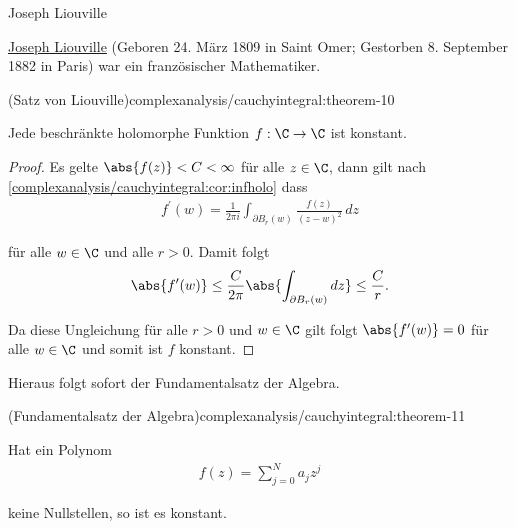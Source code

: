 \documentclass[letterpaper,10pt,german]{jupyterBook}
\begin{document}
\begin{emphBox}{Joseph Liouville}{}

\par
\href{https://de.wikipedia.org/wiki/Joseph\_Liouville}{Joseph Liouville} (Geboren 24. März 1809 in Saint Omer; Gestorben 8. September 1882 in Paris) war ein französischer Mathematiker.
\end{emphBox}
\begin{theorem}{(Satz von Liouville)}{complexanalysis/cauchyintegral:theorem-10}



\par
Jede beschränkte holomorphe Funktion \(f:\C\to\C\) ist konstant.
\end{theorem}

\begin{proof}
 Es gelte \(\abs{f(z)}< C <\infty\) für alle \(z\in\C\), dann gilt nach \cref{complexanalysis/cauchyintegral:cor:infholo}  dass
\begin{align*}
f^\prime(w) = \frac{1}{2\pi i} \int_{\partial B_r(w)} \frac{f(z)}{(z-w)^2}\, dz
\end{align*}
\par
für alle \(w\in \C\) und alle \(r> 0\). Damit folgt
\begin{align*}
\abs{f^\prime(w)}\leq \frac{C}{2 \pi} \abs{\int_{\partial B_r(w)} dz}\leq \frac{C}{r}.
\end{align*}
\par
Da diese Ungleichung für alle \(r>0\) und \(w\in\C\) gilt folgt \(\abs{f^\prime(w)} = 0\) für alle \(w\in\C\) und somit ist \(f\) konstant.
\end{proof}

\par
Hieraus folgt sofort der Fundamentalsatz der Algebra.
\begin{theorem}{(Fundamentalsatz der Algebra)}{complexanalysis/cauchyintegral:theorem-11}



\par
Hat ein Polynom
\begin{align*}
f(z)=\sum_{j=0}^N a_j z^j
\end{align*}
\par
keine Nullstellen, so ist es konstant.
\end{theorem}
\end{document}
